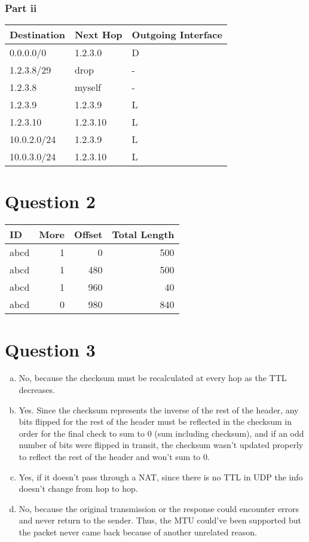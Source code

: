 \documentclass[12pt]{article}
\begin{document}
\subsubsection*{Part ii}
\begin{table}[ht]
\centering
\begin{tabular}{l|l|l}
Destination & Next Hop & Outgoing Interface \\ \hline
0.0.0.0/0   & 1.2.3.0  & D                  \\
1.2.3.8/29  & drop     & -                  \\
1.2.3.8     & myself   & -                  \\
1.2.3.9     & 1.2.3.9  & L                  \\
1.2.3.10    & 1.2.3.10 & L                  \\
10.0.2.0/24 & 1.2.3.9  & L                  \\
10.0.3.0/24 & 1.2.3.10 & L                  \\ \hline
\end{tabular}
\end{table}

\section*{Question 2}
\begin{table}[ht]
\centering
\begin{tabular}{l|r|r|r}
ID   & More & Offset & Total Length \\ \hline
abcd & 1    & 0      & 500          \\
abcd & 1    & 480    & 500          \\
abcd & 1    & 960    & 40           \\
abcd & 0    & 980    & 840          \\
\end{tabular}
\end{table}

\section*{Question 3}
\begin{enumerate}[a.]
\item No, because the checksum must be recalculated at every hop as the TTL decreases.
\item Yes. Since the checksum represents the inverse of the rest of the header, any bits flipped for the rest of the header must be reflected in the checksum in order for the final check to sum to 0 (sum including checksum), and if an odd number of bits were flipped in transit, the checksum wasn’t updated properly to reflect the rest of the header and won’t sum to 0.
\item Yes, if it doesn’t pass through a NAT, since there is no TTL in UDP the info doesn’t change from hop to hop.
\item No, because the original transmission or the response could encounter errors and never return to the sender. Thus, the MTU could’ve been supported but the packet never came back because of another unrelated reason.
\end{enumerate}
\end{document}
